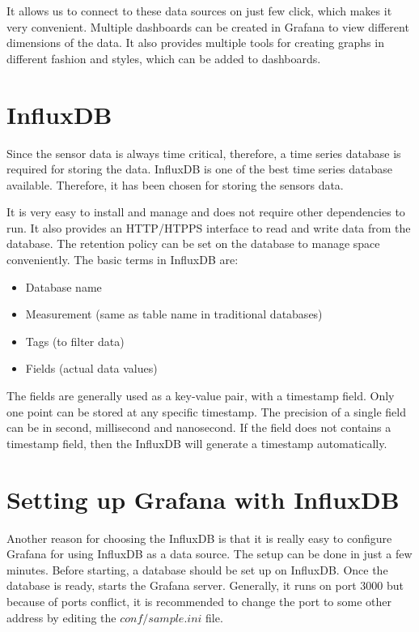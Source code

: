 It allows us to connect to these data sources on just few click, which makes it very convenient. Multiple dashboards can be created in Grafana to view different dimensions of the data. It also provides multiple tools for creating graphs in different fashion and styles, which can be added to dashboards.

\section{InfluxDB}
Since the sensor data is always time critical, therefore, a time series database is required for storing the data. InfluxDB is one of the best time series database available. Therefore, it has been chosen for storing the sensors data.

It is very easy to install and manage and does not require other dependencies to run. It also provides an HTTP/HTPPS interface to read and write data from the database. The retention policy can be set on the database to manage space conveniently. The basic terms in InfluxDB are:

\begin{itemize}
	\item Database name
	\item Measurement (same as table name in traditional databases)
	\item Tags (to filter data)
	\item Fields (actual data values)
\end{itemize}

The fields are generally used as a key-value pair, with a timestamp field. Only one point can be stored at any specific timestamp. The precision of a single field can be in second, millisecond and nanosecond. If the field does not contains a timestamp field, then the InfluxDB will generate a timestamp automatically.


\section{Setting up Grafana with InfluxDB}
Another reason for choosing the InfluxDB is that it is really easy to configure Grafana for using InfluxDB as a data source. The setup can be done in just a few minutes. Before starting, a database should be set up on InfluxDB. Once the database is ready, starts the Grafana server. Generally, it runs on port 3000 but because of ports conflict, it is recommended to change the port to some other address by editing the \textit{$conf/sample.ini$} file.


